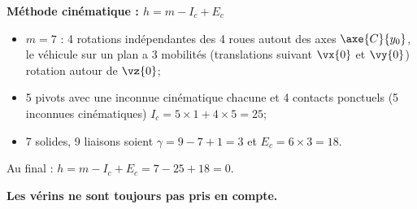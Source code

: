

\ifprof
\begin{corrige}
\textbf{Méthode cinématique : $h = m - I_c + E_c$}
\begin{itemize}
\item $m=7$ : 4 rotations indépendantes des 4 roues autout des axes $\axe{C}{y_0}$, le véhicule sur un plan a 3 mobilités (translations suivant $\vx{0}$ et $\vy{0}$) rotation autour de $\vz{0}$;
\item 5 pivots avec une inconnue cinématique chacune et 4 contacts ponctuels (5 inconnues cinématiques) $I_c = 5\times 1 + 4\times 5 = 25$;
\item 7 solides, 9 liaisons soient $\gamma = 9-7+1 = 3$ et $E_c = 6\times 3 = 18$.
\end{itemize}
Au final : $h = m - I_c + E_c= 7 - 25 + 18 = 0$.
\end{corrige}
\else\fi

\textbf{Les vérins ne sont toujours pas pris en compte.}

